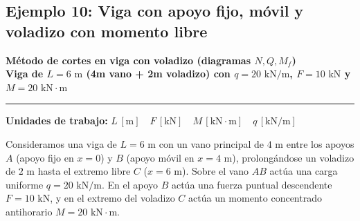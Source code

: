 \subsection{Ejemplo 10: Viga con apoyo fijo, móvil y voladizo con momento libre}

\begin{tcolorbox}[colback=blue!3!white, colframe=blue!40!black, arc=3pt, boxrule=0.8pt, left=8pt, right=8pt, top=6pt, bottom=6pt]
    \centering
    {\Large\bfseries\color{blue!60!black} Método de cortes en viga con voladizo (diagramas $N, Q, M_f$)}\\[2pt]
    {\normalsize\bfseries Viga de $L = 6\text{ m}$ (4m vano + 2m voladizo) con $q = 20\text{ kN/m}$, $F = 10\text{ kN}$ y $M = 20\text{ kN}\cdot\text{m}$}

    \vspace{4pt}\hrule\vspace{4pt}
    {\small\textbf{Unidades de trabajo:} $L\,[\text{m}] \quad F\,[\text{kN}] \quad M\,[\text{kN}\cdot\text{m}] \quad q\,[\text{kN/m}]$}
\end{tcolorbox}


Consideramos una viga de $L = 6\text{ m}$ con un vano principal de $4\text{ m}$ entre los apoyos $A$ (apoyo fijo en $x=0$) y $B$ (apoyo móvil en $x=4\text{ m}$), prolongándose un voladizo de $2\text{ m}$ hasta el extremo libre $C$ ($x=6\text{ m}$). Sobre el vano $AB$ actúa una carga uniforme $q = 20\text{ kN/m}$. En el apoyo $B$ actúa una fuerza puntual descendente $F = 10\text{ kN}$, y en el extremo del voladizo $C$ actúa un momento concentrado antihorario $M = 20\text{ kN}\cdot\text{m}$.

